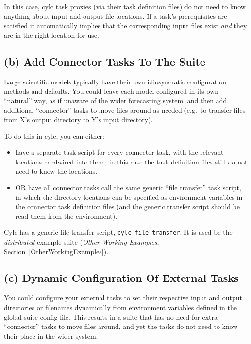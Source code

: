 \documentclass[11pt,a4paper]{article}
\begin{document}
In this case, cylc task proxies (via their task definition files) do not
need to know anything about input and output file locations. If a task's
prerequisites are satisfied it automatically implies that the
corresponding input files exist {\em and} they are in the right location
for use.

\subsection{(b) Add Connector Tasks To The Suite} 

Large scientific models typically have their own idiosyncratic
configuration methods and defaults. You could leave each model
configured in its own ``natural'' way, as if unaware of the wider
forecasting system, and then add additional ``connector'' tasks to move
files around as needed (e.g.\ to transfer files from X's output
directory to Y's input directory).

To do this in cylc, you can either:

\begin{itemize}
    \item have a separate task script for every connector task, with the
        relevant locations hardwired into them; in this case the task
        definition files still do not need to know the locations.
    \item OR have all connector tasks call the same generic ``file
        transfer'' task script, in which the directory locations can be
        specified as environment variables in the connector task
        definition files (and the generic transfer script should be read
        them from the environment).
\end{itemize}

Cylc has a generic file transfer script, \lstinline=cylc file-transfer=. 
It is used be the {\em distributed} example suite ({\em Other Working
Examples}, Section~\ref{OtherWorkingExamples}).

\subsection{(c) Dynamic Configuration Of External Tasks}

You could configure your external tasks to set their respective input
and output directories or filenames dynamically from environment
variables defined in the global suite config file. This results in a
suite that has no need for extra ``connector'' tasks to move files
around, and yet the tasks do not need to know their place in the wider
system.
\end{document}
